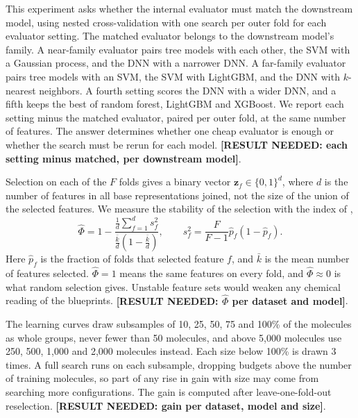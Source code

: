 This experiment asks whether the internal evaluator must match the downstream model, using nested cross-validation with one search per outer fold for each evaluator setting. The matched evaluator belongs to the downstream model's family. A near-family evaluator pairs tree models with each other, the SVM with a Gaussian process, and the DNN with a narrower DNN. A far-family evaluator pairs tree models with an SVM, the SVM with LightGBM, and the DNN with $k$-nearest neighbors. A fourth setting scores the DNN with a wider DNN, and a fifth keeps the best of random forest, LightGBM and XGBoost. We report each setting minus the matched evaluator, paired per outer fold, at the same number of features. The answer determines whether one cheap evaluator is enough or whether the search must be rerun for each model. \textbf{[RESULT NEEDED: each setting minus matched, per downstream model]}.

Selection on each of the $F$ folds gives a binary vector $\mathbf{z}_f \in \{0,1\}^d$, where $d$ is the number of features in all base representations joined, not the size of the union of the selected features. We measure the stability of the selection with the index of \citet{Nogueira2018},
\[
\hat\Phi = 1 - \frac{\frac1d\sum_{f=1}^d s_f^2}{\frac{\bar k}{d}\left(1-\frac{\bar k}{d}\right)}, \qquad s_f^2 = \frac{F}{F-1}\hat p_f(1-\hat p_f).
\]
Here $\hat p_f$ is the fraction of folds that selected feature $f$, and $\bar k$ is the mean number of features selected. $\hat\Phi=1$ means the same features on every fold, and $\hat\Phi \approx 0$ is what random selection gives. Unstable feature sets would weaken any chemical reading of the blueprints. \textbf{[RESULT NEEDED: $\hat\Phi$ per dataset and model]}.

The learning curves draw subsamples of 10, 25, 50, 75 and 100\% of the molecules as whole groups, never fewer than 50 molecules, and above 5,000 molecules use 250, 500, 1,000 and 2,000 molecules instead. Each size below 100\% is drawn 3 times. A full search runs on each subsample, dropping budgets above the number of training molecules, so part of any rise in gain with size may come from searching more configurations. The gain is computed after leave-one-fold-out reselection. \textbf{[RESULT NEEDED: gain per dataset, model and size]}.


